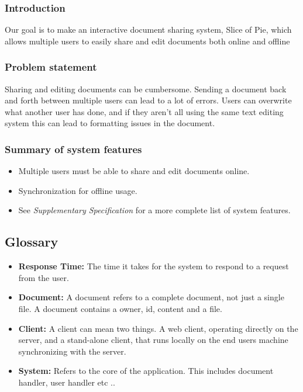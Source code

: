 \documentclass[11pt]{article}
\begin{document}
\subsubsection{Introduction}
\label{sec-1-1-1}

Our goal is to make an interactive document sharing system, Slice of Pie,  which allows multiple users to easily share and edit documents both online and offline
\subsubsection{Problem statement}
\label{sec-1-1-2}

    Sharing and editing documents can be cumbersome. 
    Sending a document back and forth between multiple users can lead to a lot of errors. Users can overwrite what another user has done, and if they aren't all
    using the same text editing system this can lead to formatting issues in the document.
\subsubsection{Summary of system features}
\label{sec-1-1-3}

\begin{itemize}
\item Multiple users must be able to share and edit documents online.
\item Synchronization for offline usage.
\item See \emph{Supplementary Specification} for a more complete list of system features.
\end{itemize}
\subsection{Glossary}
\label{sec-1-2}

\begin{itemize}
\item \textbf{Response Time:} The time it takes for the system to respond to a request from the user.
\item \textbf{Document:} A document refers to a complete document, not just a single file. A document contains a owner, id, content and a file.
\item \textbf{Client:} A client can mean two things. A web client, operating directly on the server, and a stand-alone client, that runs locally on the end users machine synchronizing with the server.
\item \textbf{System:} Refers to the core of the application. This includes document handler, user handler etc ..
\end{itemize}
\end{document}
